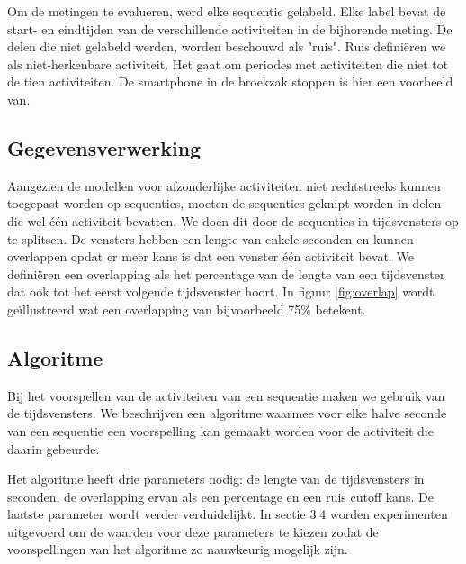 \documentclass{article}
\begin{document}
Om de metingen te evalueren, werd elke sequentie gelabeld. Elke label bevat de start- en eindtijden van de verschillende activiteiten in de bijhorende meting. De delen die niet gelabeld werden, worden beschouwd als "ruis". Ruis defini\"eren we als niet-herkenbare activiteit. Het gaat om periodes met activiteiten die niet tot de tien activiteiten. De smartphone in de broekzak stoppen is hier een voorbeeld van.

\subsection{Gegevensverwerking}

Aangezien de modellen voor afzonderlijke activiteiten niet rechtstreeks kunnen toegepast worden op sequenties, moeten de sequenties geknipt worden in delen die wel \'e\'en activiteit bevatten. We doen dit door de sequenties in tijdsvensters op te splitsen. De vensters hebben een lengte van enkele seconden en kunnen overlappen opdat er meer kans is dat een venster \'e\'en activiteit bevat. We defini\"eren een overlapping als het percentage van de lengte van een tijdsvenster dat ook tot het eerst volgende tijdsvenster hoort. In figuur \ref{fig:overlap} wordt ge\"illustreerd wat een overlapping van bijvoorbeeld 75\% betekent.

\subsection{Algoritme}

Bij het voorspellen van de activiteiten van een sequentie maken we gebruik van de tijdsvensters. We beschrijven een algoritme waarmee voor elke halve seconde van een sequentie een voorspelling kan gemaakt worden voor de activiteit die daarin gebeurde.

Het algoritme heeft drie parameters nodig: de lengte van de tijdsvensters in seconden, de overlapping ervan als een percentage en een ruis cutoff kans. De laatste parameter wordt verder verduidelijkt. In sectie 3.4 worden experimenten uitgevoerd om de waarden voor deze parameters te kiezen zodat de voorspellingen van het algoritme zo nauwkeurig mogelijk zijn.
\end{document}
